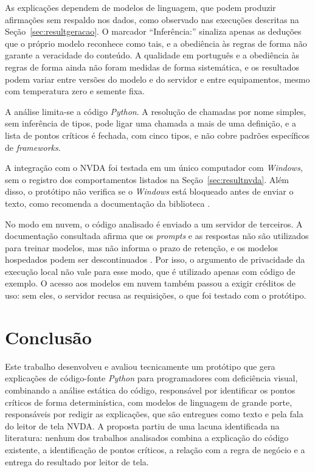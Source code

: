 \documentclass[
    12pt,                   %
    openright,              %
    oneside,                %
    a4paper,                %
    sumario=tradicional,    %
    english,                %
    brazil,                 %
    ]{abntex2}
\begin{document}
As explicações dependem de modelos de linguagem, que podem produzir afirmações sem respaldo nos dados, como observado nas execuções descritas na Seção~\ref{sec:resultgeracao}. O marcador \enquote{Inferência:} sinaliza apenas as deduções que o próprio modelo reconhece como tais, e a obediência às regras de forma não garante a veracidade do conteúdo. A qualidade em português e a obediência às regras de forma ainda não foram medidas de forma sistemática, e os resultados podem variar entre versões do modelo e do servidor e entre equipamentos, mesmo com temperatura zero e semente fixa.

A análise limita-se a código \textit{Python}. A resolução de chamadas por nome simples, sem inferência de tipos, pode ligar uma chamada a mais de uma definição, e a lista de pontos críticos é fechada, com cinco tipos, e não cobre padrões específicos de \textit{frameworks}.

A integração com o NVDA foi testada em um único computador com \textit{Windows}, sem o registro dos comportamentos listados na Seção~\ref{sec:resultnvda}. Além disso, o protótipo não verifica se o \textit{Windows} está bloqueado antes de enviar o texto, como recomenda a documentação da biblioteca \cite{nvaccess2024controller}.

No modo em nuvem, o código analisado é enviado a um servidor de terceiros. A documentação consultada afirma que os \textit{prompts} e as respostas não são utilizados para treinar modelos, mas não informa o prazo de retenção, e os modelos hospedados podem ser descontinuados \cite{ollama2026nuvem}. Por isso, o argumento de privacidade da execução local não vale para esse modo, que é utilizado apenas com código de exemplo. O acesso aos modelos em nuvem também passou a exigir créditos de uso: sem eles, o servidor recusa as requisições, o que foi testado com o protótipo.


\chapter{Conclusão}\label{sec:conclusao}

Este trabalho desenvolveu e avaliou tecnicamente um protótipo que gera explicações de código-fonte \textit{Python} para programadores com deficiência visual, combinando a análise estática do código, responsável por identificar os pontos críticos de forma determinística, com modelos de linguagem de grande porte, responsáveis por redigir as explicações, que são entregues como texto e pela fala do leitor de tela NVDA. A proposta partiu de uma lacuna identificada na literatura: nenhum dos trabalhos analisados combina a explicação do código existente, a identificação de pontos críticos, a relação com a regra de negócio e a entrega do resultado por leitor de tela.
\end{document}
